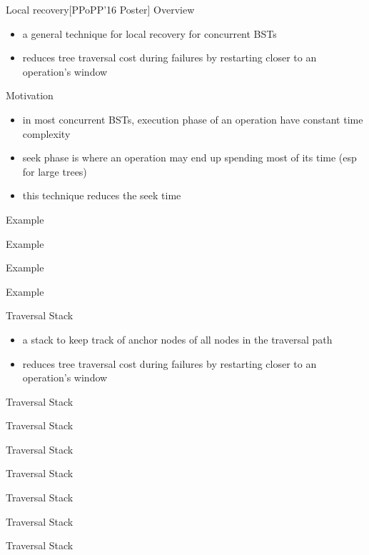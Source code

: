 \begin{frame}[c]{Local recovery[PPoPP'16 Poster]}
Overview
\begin{itemize}
\item a general technique for local recovery for concurrent BSTs
\item reduces tree traversal cost during failures by restarting closer to an operation's window
\end{itemize}
Motivation
\begin{itemize}
\item in most concurrent BSTs, execution phase of an operation have constant time complexity
\item seek phase is where an operation may end up spending most of its time (esp for large trees)
\item this technique reduces the seek time
\end{itemize}
\end{frame}

\begin{frame}[c]{Example}

\end{frame}

\begin{frame}[c]{Example}

\end{frame}

\begin{frame}[c]{Example}

\end{frame}

\begin{frame}[c]{Example}

\end{frame}

\begin{frame}[c]{Traversal Stack}
\begin{itemize}
\item a stack to keep track of anchor nodes of all nodes in the traversal path
\item reduces tree traversal cost during failures by restarting closer to an operation's window
\end{itemize}
\end{frame}

\begin{frame}[c]{Traversal Stack}

\end{frame}
\begin{frame}[c]{Traversal Stack}

\end{frame}
\begin{frame}[c]{Traversal Stack}

\end{frame}
\begin{frame}[c]{Traversal Stack}

\end{frame}
\begin{frame}[c]{Traversal Stack}

\end{frame}
\begin{frame}[c]{Traversal Stack}

\end{frame}
\begin{frame}[c]{Traversal Stack}

\end{frame}


